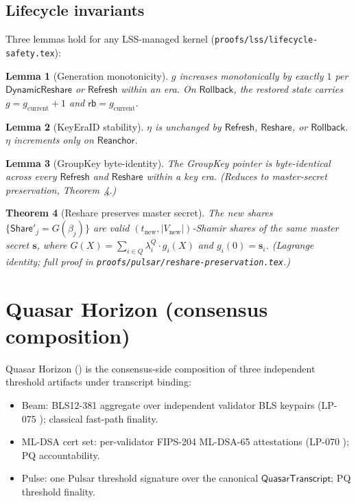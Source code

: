 \documentclass[11pt,a4paper]{article}
\newtheorem{theorem}{Theorem}
\newtheorem{lemma}[theorem]{Lemma}
\begin{document}
\subsection{Lifecycle invariants}

Three lemmas hold for any LSS-managed kernel (\texttt{proofs/lss/lifecycle-safety.tex}):

\begin{lemma}[Generation monotonicity]
$g$ increases monotonically by exactly $1$ per $\mathsf{DynamicReshare}$ or $\mathsf{Refresh}$ within an era. On $\mathsf{Rollback}$, the restored state carries $g = g_{\mathrm{current}}+1$ and $\mathsf{rb} = g_{\mathrm{current}}$.
\end{lemma}

\begin{lemma}[KeyEraID stability]
$\eta$ is unchanged by $\mathsf{Refresh}$, $\mathsf{Reshare}$, or $\mathsf{Rollback}$. $\eta$ increments only on $\mathsf{Reanchor}$.
\end{lemma}

\begin{lemma}[GroupKey byte-identity]
\label{lem:gk-byte-identical-spec}
The GroupKey pointer is byte-identical across every $\mathsf{Refresh}$ and $\mathsf{Reshare}$ within a key era. (Reduces to master-secret preservation, Theorem~\ref{thm:reshare-preserves-secret}.)
\end{lemma}

\begin{theorem}[Reshare preserves master secret]
\label{thm:reshare-preserves-secret}
The new shares $\{\mathsf{Share}'_j = G(\beta_j)\}$ are valid $(t_{\mathrm{new}}, |V_{\mathrm{new}}|)$-Shamir shares of the same master secret $\mathbf{s}$, where $G(X) = \sum_{i \in Q} \lambda^Q_i \cdot g_i(X)$ and $g_i(0) = \mathbf{s}_i$. (Lagrange identity; full proof in \texttt{proofs/pulsar/reshare-preservation.tex}.)
\end{theorem}

\section{Quasar Horizon (consensus composition)}
\label{sec:spec-horizon}

Quasar Horizon (\cite{luxquasarhorizon}) is the consensus-side composition of three independent threshold artifacts under transcript binding:

\begin{itemize}[leftmargin=2em,nosep]
  \item Beam: BLS12-381 aggregate over independent validator BLS keypairs (LP-075 \cite{lp075}); classical fast-path finality.
  \item ML-DSA cert set: per-validator FIPS-204 ML-DSA-65 attestations (LP-070 \cite{lp070}); PQ accountability.
  \item Pulse: one Pulsar threshold signature over the canonical $\mathsf{QuasarTranscript}$; PQ threshold finality.
\end{itemize}
\end{document}
